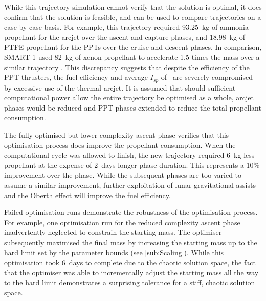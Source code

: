 %

While this trajectory simulation cannot verify that the solution is optimal, it does confirm that the solution is feasible, and can be used to compare trajectories on a case-by-case basis. For example, this trajectory required 93.25~kg of ammonia propellant for the arcjet over the ascent and capture phases, and 18.98~kg of PTFE propellant for the PPTs over the cruise and descent phases. In comparison, SMART-1 used 82~kg of xenon propellant to accelerate 1.5 times the mass over a similar trajectory \parencite{Estublier2007}. This discrepancy suggests that despite the efficiency of the PPT thrusters, the fuel efficiency and average $I_{sp}$ of \BW\ are severely compromised by excessive use of the thermal arcjet. It is assumed that should sufficient computational power allow the entire trajectory be optimised as a whole, arcjet phases would be reduced and PPT phases extended to reduce the total propellant consumption.



The fully optimised but lower complexity ascent phase verifies that this optimisation process does improve the propellant consumption. When the computational cycle was allowed to finish, the new trajectory required 6~kg less propellant at the expense of 2~days longer phase duration. This represents a 10\% improvement over the phase. While the subsequent phases are too varied to assume a similar improvement, further exploitation of lunar gravitational assists and the Oberth effect will improve the fuel efficiency.

Failed optimisation runs demonstrate the robustness of the optimisation process. For example, one optimisation run for the reduced complexity ascent phase inadvertently neglected to constrain the starting mass. The optimiser subsequently maximised the final mass by increasing the starting mass up to the hard limit set by the parameter bounds (see \autoref{sub:Scaling}). While this optimisation took 6~days to complete due to the chaotic solution space, the fact that the optimiser was able to incrementally adjust the starting mass all the way to the hard limit demonstrates a surprising tolerance for a stiff, chaotic solution space.

